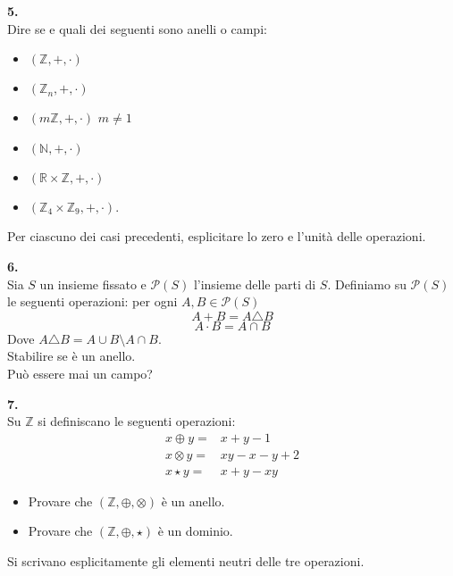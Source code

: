 \documentclass[italian,a4paper,11pt]
{article}
\newcommand{\Z}{\mathbb Z}
\newcommand{\R}{\mathbb{R}}
\newcommand{\N}{\mathbb{N}}
\begin{document}
\vspace{0.4cm}
\noindent
\begin{Ex}\textbf{ 5.}\\
Dire se e quali dei seguenti sono anelli o campi:
\begin{itemize}
	\item $(\Z,+,\cdot)$
	\item $(\Z_n,+,\cdot)$
	\item $(m\Z,+,\cdot)$  $m\neq 1$
	\item $(\N,+,\cdot)$
	\item $(\R \times \Z,+,\cdot)$
	\item $(\Z_4\times \Z_9,+,\cdot)$.
\end{itemize}
Per ciascuno dei casi precedenti, esplicitare lo zero e l'unit\`a delle operazioni.
\end{Ex}


\vspace{3cm}
\noindent
\begin{Ex}\textbf{ 6.}\\ 
Sia $S$ un insieme fissato e $\mathcal{P}(S)$ l'insieme delle parti di $S$. Definiamo su $\mathcal{P}(S)$ le seguenti operazioni: per ogni $A,B \in \mathcal{P}(S)$
$$A+B=A\triangle B$$
$$A\cdot B=A\cap B$$
Dove $A\triangle B=A\cup B \setminus A\cap B$.\\
Stabilire se \`e un anello.\\
Pu\`o essere mai un campo?
\end{Ex}

\vspace{0.4cm}
\noindent
\begin{Ex}\textbf{ 7.}\\ 
Su $\Z$ si definiscano le seguenti operazioni:
$$\begin{array}{cc}
x\oplus y=&x+y-1\\
x\otimes y=&xy-x-y+2\\
x\star y=&x+y-xy
\end{array}$$
\begin{itemize}
	\item Provare che $(\Z,\oplus,\otimes)$ \`e un anello.
	\item Provare che $(\Z,\oplus,\star)$ \`e un dominio.
\end{itemize}
Si scrivano esplicitamente gli elementi neutri delle tre operazioni.
\end{Ex}
\end{document}
